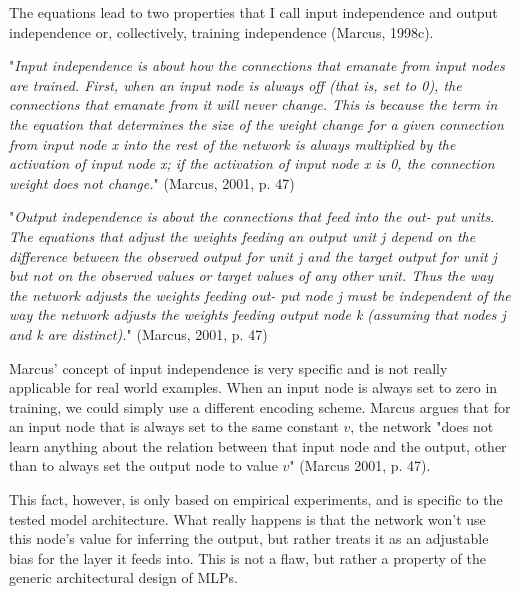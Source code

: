 \documentclass[../../main.tex]{subfiles}
\begin{document}
\begin{citecallout}
    The equations lead to two properties that I call input independence and
    output independence or, collectively, training independence (Marcus, 1998c).
\end{citecallout}

\begin{definition}
    "\emph{Input independence is about how the connections that emanate from input nodes are trained. First, when an input node is always off (that is, set
    to 0), the connections that emanate from it will never change. This is
    because the term in the equation that determines the size of the weight
    change for a given connection from input node x into the rest of the network is always multiplied by the activation of input node x; if the activation of input node x is 0, the connection weight does not change.}" (Marcus, 2001, p. 47)
\end{definition}

\begin{definition}
    "\emph{Output independence is about the connections that feed into the out-
    put units. The equations that adjust the weights feeding an output unit
    j depend on the difference between the observed output for unit j and
    the target output for unit j but not on the observed values or target values of
    any other unit. Thus the way the network adjusts the weights feeding out-
    put node j must be independent of the way the network adjusts the
    weights feeding output node k (assuming that nodes j and k are distinct).}" (Marcus, 2001, p. 47)
\end{definition}

\begin{critique}
    Marcus' concept of input independence is very specific and is not really applicable for real world examples. When an input node is always set to zero in training, we could simply use a different encoding scheme. Marcus argues that for an input node that is always set to the same constant $v$, the network "does not learn anything about the relation between that
    input node and the output, other than to always set the output node to value $v$" (Marcus 2001, p. 47).

    This fact, however, is only based on empirical experiments, and is specific to the tested model architecture. What really happens is that the network won't use this node's value for inferring the output, but rather treats it as an adjustable bias for the layer it feeds into. This is not a flaw, but rather a property of the generic architectural design of MLPs.
\end{critique}
\end{document}

